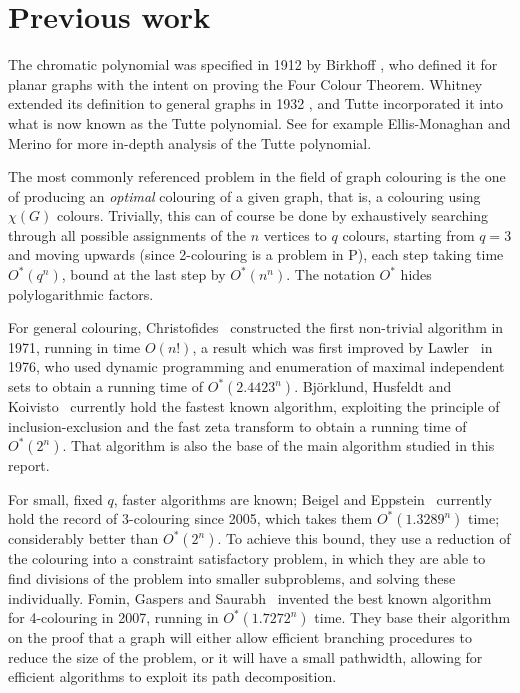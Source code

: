 \documentclass{cslthse-msc}
\begin{document}
\section{Previous work}
The chromatic polynomial was specified in 1912 by Birkhoff \cite{birkhoff}, who defined it for planar graphs with the intent on proving the Four Colour Theorem. Whitney extended its definition to general graphs in 1932 \cite{whitney}, and Tutte incorporated it into what is now known as the Tutte polynomial. See for example Ellis-Monaghan and Merino \cite{tuttebook} for more in-depth analysis of the Tutte polynomial.

The most commonly referenced problem in the field of graph colouring is the one of producing an \emph{optimal} colouring of a given graph, that is, a colouring using $\chi(G)$ colours. Trivially, this can of course be done by exhaustively searching through all possible assignments of the $n$ vertices to $q$ colours, starting from $q = 3$ and moving upwards (since 2-colouring is a problem in P), each step taking time $O^*(q^n)$, bound at the last step by $O^*(n^n)$. The notation $O^*$ hides polylogarithmic factors.

For general colouring, Christofides~\cite{christo} constructed the first non-trivial algorithm in 1971, running in time $O(n!)$, a result which was first improved by Lawler~\cite{lawler} in 1976, who used dynamic programming and enumeration of maximal independent sets to obtain a running time of $O^*(2.4423^n)$. Björklund, Husfeldt and Koivisto~\cite{bhk1} currently hold the fastest known algorithm, exploiting the principle of inclusion-exclusion and the fast zeta transform to obtain a running time of $O^*(2^n)$. That algorithm is also the base of the main algorithm studied in this report.

For small, fixed $q$, faster algorithms are known; Beigel and Eppstein~\cite{3coloring} currently hold the record of 3-colouring since 2005, which takes them $O^*(1.3289^n)$ time; considerably better than $O^*(2^n)$. To achieve this bound, they use a reduction of the colouring into a constraint satisfactory problem, in which they are able to find divisions of the problem into smaller subproblems, and solving these individually.
Fomin, Gaspers and Saurabh~\cite{4coloring} invented the best known algorithm for 4-colouring in 2007, running in $O^*(1.7272^n)$ time. They base their algorithm on the proof that a graph will either allow efficient branching procedures to reduce the size of the problem, or it will have a small pathwidth, allowing for efficient algorithms to exploit its path decomposition.
\end{document}
